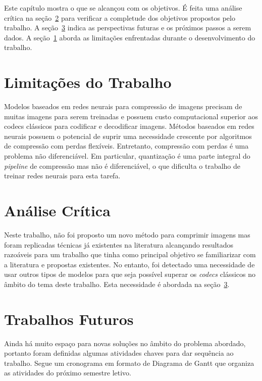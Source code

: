 Este capítulo mostra o que se alcançou com os objetivos. É feita uma análise crítica na seção~\ref{sec:analise} para verificar a completude dos objetivos propostos pelo trabalho. A seção~\ref{sec:futuro} indica as perspectivas futuras e os próximos passos a serem dados. A seção~\ref{sec:limitacoes} aborda as limitações enfrentadas durante o desenvolvimento do trabalho.

\section{Limitações do Trabalho}
\label{sec:limitacoes}
Modelos baseados em redes neurais para compressão de imagens precisam de muitas imagens para serem treinadas e possuem custo computacional superior aos codecs clássicos para codificar e decodificar imagens. Métodos baseados em redes neurais possuem o potencial de suprir uma necessidade crescente por algoritmos de compressão com perdas flexíveis. Entretanto, compressão com perdas é uma problema não diferenciável. Em particular, quantização é uma parte integral do \textit{pipeline} de compressão mas não é diferenciável, o que dificulta o trabalho de treinar redes neurais para esta tarefa.
\section{Análise Crítica}
\label{sec:analise}
Neste trabalho, não foi proposto um novo método para comprimir imagens mas foram replicadas técnicas já existentes na literatura alcançando resultados razoáveis para um trabalho que tinha como principal objetivo se familiarizar com a literatura e propostas existentes. No entanto, foi detectado uma necessidade de usar outros tipos de modelos para que seja possível superar os \textit{codecs} clássicos no âmbito do tema deste trabalho. Esta necessidade é abordada na seção~\ref{sec:futuro}.
\section{Trabalhos Futuros}
\label{sec:futuro}
Ainda há muito espaço para novas soluções no âmbito do problema abordado, portanto foram definidas algumas atividades chaves para dar sequência ao trabalho. Segue um cronograma em formato de Diagrama de Gantt que organiza as atividades do próximo semestre letivo.

